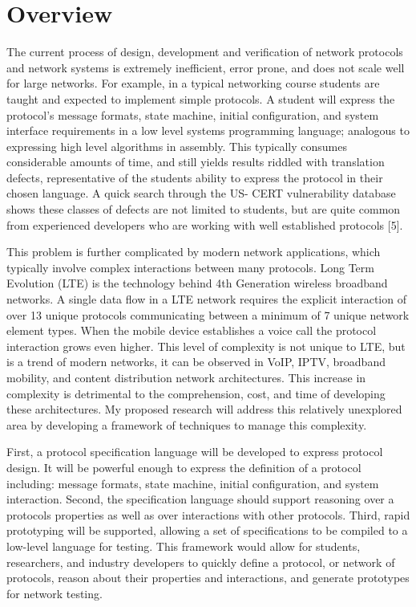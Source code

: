 \section{Overview}

The current process of design, development and verification of network protocols
and network systems is extremely inefficient, error prone, and does not scale
well for large networks. For example, in a typical networking course students
are taught and expected to implement simple protocols. A student will express
the protocol’s message formats, state machine, initial configuration, and system
interface requirements in a low level systems programming language; analogous to
expressing high level algorithms in assembly. This typically consumes
considerable amounts of time, and still yields results riddled with translation
defects, representative of the students ability to express the protocol in their
chosen language. A quick search through the US- CERT vulnerability database
shows these classes of defects are not limited to students, but are quite common
from experienced developers who are working with well established protocols [5].

This problem is further complicated by modern network applications, which
typically involve complex interactions between many protocols. Long Term
Evolution (LTE) is the technology behind 4th Generation wireless broadband
networks. A single data flow in a LTE network requires the explicit interaction
of over 13 unique protocols communicating between a minimum of 7 unique network
element types. When the mobile device establishes a voice call the protocol
interaction grows even higher. This level of complexity is not unique to LTE,
but is a trend of modern networks, it can be observed in VoIP, IPTV, broadband
mobility, and content distribution network architectures. This increase in
complexity is detrimental to the comprehension, cost, and time of developing
these architectures. My proposed research will address this relatively
unexplored area by developing a framework of techniques to manage this
complexity.

First, a protocol specification language will be developed to express protocol
design. It will be powerful enough to express the definition of a protocol
including: message formats, state machine, initial configuration, and system
interaction. Second, the specification language should support reasoning over a
protocols properties as well as over interactions with other protocols. Third,
rapid prototyping will be supported, allowing a set of specifications to be
compiled to a low-level language for testing. This framework would allow for
students, researchers, and industry developers to quickly define a protocol, or
network of protocols, reason about their properties and interactions, and
generate prototypes for network testing.


